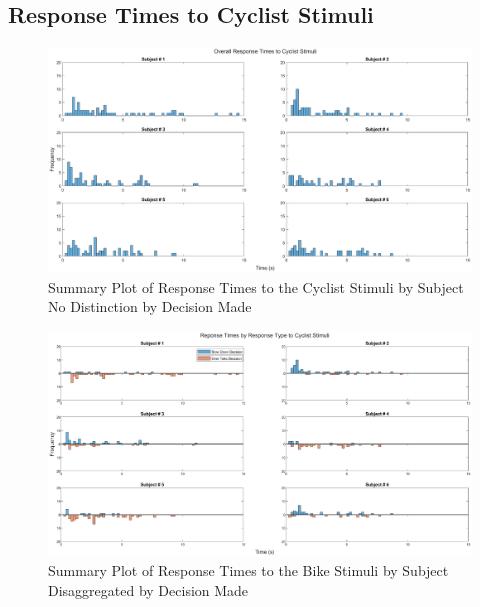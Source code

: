 \begin{appendices}
\subsection{Response Times to Cyclist Stimuli}
\begin{figure}[H]
    \centering
    \includegraphics[width=\linewidth, height=\plotHeight\linewidth]{figures/BikeReactionTimes_by_sub.eps}
    \caption{Summary Plot of Response Times to the Cyclist Stimuli by Subject No Distinction by Decision Made}
    \label{fig:RT_B_1bysub}
\end{figure}
\begin{figure}[H]
    \centering
    \includegraphics[width=\linewidth, height=\plotHeight\linewidth]{figures/BikeReactionTimes2_by_sub.eps}
    \caption{Summary Plot of Response Times to the Bike Stimuli by Subject Disaggregated by Decision Made}
    \label{fig:RT_B_2bysub}
\end{figure}


\end{appendices}
